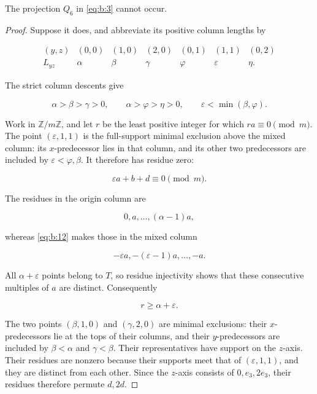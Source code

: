 \begin{lemma}\label{lemma:b:3.1}

The projection \(Q_6\) in \eqref{eq:b:3} cannot occur.

\end{lemma}
\begin{proof}

Suppose it does, and abbreviate its positive column lengths by

\begin{equation}
\begin{array}{c|cccccc}
(y,z)&(0,0)&(1,0)&(2,0)&(0,1)&(1,1)&(0,2)\\ \hline
L_{yz}&\alpha&\beta&\gamma&\varphi&\varepsilon&\eta.
\end{array}
\label{eq:b:10}
\end{equation}

The strict column descents give

\begin{equation}
\alpha>\beta>\gamma>0,
\qquad
\alpha>\varphi>\eta>0,
\qquad
\varepsilon<\min(\beta,\varphi).
\label{eq:b:11}
\end{equation}

Work in \(\mathbb Z/m\mathbb Z\), and let \(r\) be the least positive
integer for which \(ra\equiv0\pmod m\). The point
\((\varepsilon,1,1)\) is the full-support minimal exclusion above the mixed
column: its \(x\)-predecessor lies in that column, and its other two
predecessors are included by \(\varepsilon<\varphi,\beta\). It therefore has
residue zero:

\begin{equation}
\varepsilon a+b+d\equiv0\pmod m.
\label{eq:b:12}
\end{equation}

The residues in the origin column are

\[
0,a,\ldots,(\alpha-1)a,
\]

whereas \eqref{eq:b:12} makes those in the mixed column

\[
-\varepsilon a,-(\varepsilon-1)a,\ldots,-a.
\]

All \(\alpha+\varepsilon\) points belong to \(T\), so residue injectivity
shows that these consecutive multiples of \(a\) are distinct. Consequently

\begin{equation}
r\ge\alpha+\varepsilon.
\label{eq:b:13}
\end{equation}

The two points \((\beta,1,0)\) and \((\gamma,2,0)\) are minimal
exclusions: their \(x\)-predecessors lie at the tops of their columns, and
their \(y\)-predecessors are included by \(\beta<\alpha\) and
\(\gamma<\beta\). Their representatives have support on the \(z\)-axis.
Their residues are nonzero because their supports meet that of
\((\varepsilon,1,1)\), and they are distinct from each other. Since the
\(z\)-axis consists of \(0,e_3,2e_3\), their residues therefore permute
\(d,2d\).


\end{proof}
